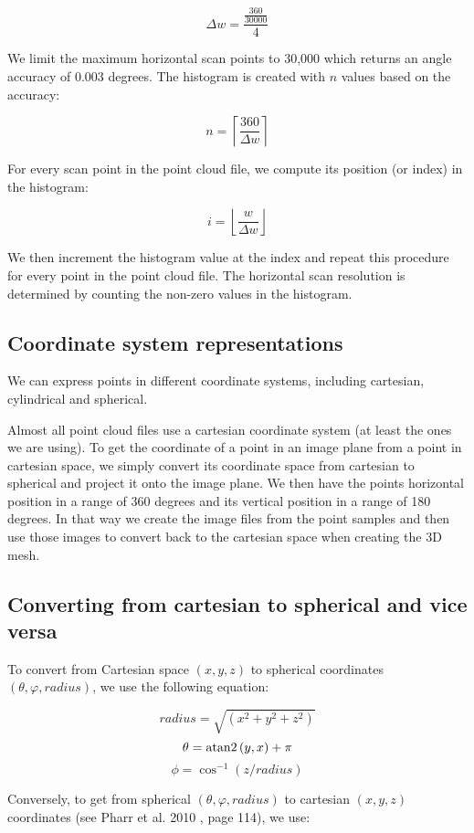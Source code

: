 $$ \Delta{w}=  \frac{\frac{360}{30000}}{4} $$

We limit the maximum horizontal scan points to 30,000 which returns an angle accuracy of 0.003 degrees. The histogram is created with $n$ values based on the accuracy:

$$ n = \left\lceil \frac{360}{ \Delta{w} } \right\rceil $$

For every scan point in the point cloud file, we compute its position (or index) in the histogram:

$$ i = \left\lfloor \frac{w}{ \Delta{w} } \right\rfloor $$

We then increment the histogram value at the index and repeat this procedure for every point in the point cloud file. The horizontal scan resolution is determined by counting the non-zero values in the histogram.


\subsection{Coordinate system representations}

We can express points in different coordinate systems, including cartesian, cylindrical and spherical.

Almost all point cloud files use a cartesian coordinate system (at least the ones we are using). To get the coordinate of a point in an image plane from a point in cartesian space, we simply convert its coordinate space from cartesian to spherical and project it onto the image plane. We then have the points horizontal position in a range of 360 degrees and its vertical position in a range of 180 degrees. In that way we create the image files from the point samples and then use those images to convert back to the cartesian space when creating the 3D mesh.

\subsection{Converting from cartesian to spherical and vice versa}

To convert from Cartesian space {$(x, y, z)$} to spherical coordinates {$(\theta, \varphi, radius)$}, we use the following equation:

$$radius = \sqrt{ (x^2 + y^2 + z^2) } $$
$$\theta = {\rm atan2} \left(y , x\right) + \pi$$
$$\phi = \cos^{-1} (z / radius)$$

Conversely, to get from spherical {$(\theta, \varphi, radius)$} to cartesian {$(x, y, z)$} coordinates (see Pharr et al. 2010 \parencite{Pharr:2010:PBR:1854996}, page 114), we use:

